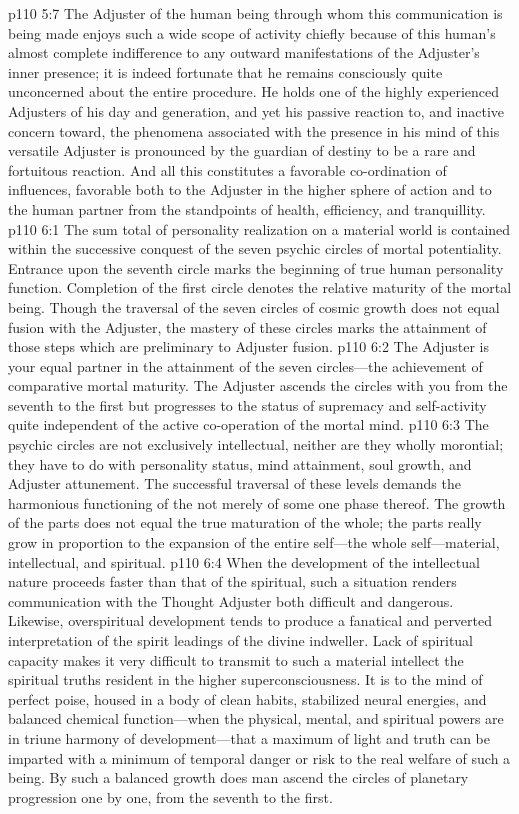\pc \vs p110 5:7 The Adjuster of the human being through whom this communication is being made enjoys such a wide scope of activity chiefly because of this human’s almost complete indifference to any outward manifestations of the Adjuster’s inner presence; it is indeed fortunate that he remains consciously quite unconcerned about the entire procedure. He holds one of the highly experienced Adjusters of his day and generation, and yet his passive reaction to, and inactive concern toward, the phenomena associated with the presence in his mind of this versatile Adjuster is pronounced by the guardian of destiny to be a rare and fortuitous reaction. And all this constitutes a favorable co\hyp{}ordination of influences, favorable both to the Adjuster in the higher sphere of action and to the human partner from the standpoints of health, efficiency, and tranquillity.
\vs p110 6:1 The sum total of personality realization on a material world is contained within the successive conquest of the seven psychic circles of mortal potentiality. Entrance upon the seventh circle marks the beginning of true human personality function. Completion of the first circle denotes the relative maturity of the mortal being. Though the traversal of the seven circles of cosmic growth does not equal fusion with the Adjuster, the mastery of these circles marks the attainment of those steps which are preliminary to Adjuster fusion.
\vs p110 6:2 The Adjuster is your equal partner in the attainment of the seven circles---the achievement of comparative mortal maturity. The Adjuster ascends the circles with you from the seventh to the first but progresses to the status of supremacy and self\hyp{}activity quite independent of the active co\hyp{}operation of the mortal mind.\plusone
\pc \vs p110 6:3 The psychic circles are not exclusively intellectual, neither are they wholly morontial; they have to do with personality status, mind attainment, soul growth, and Adjuster attunement. The successful traversal of these levels demands the harmonious functioning of the  not merely of some one phase thereof. The growth of the parts does not equal the true maturation of the whole; the parts really grow in proportion to the expansion of the entire self---the whole self---material, intellectual, and spiritual.
\vs p110 6:4 When the development of the intellectual nature proceeds faster than that of the spiritual, such a situation renders communication with the Thought Adjuster both difficult and dangerous. Likewise, overspiritual development tends to produce a fanatical and perverted interpretation of the spirit leadings of the divine indweller. Lack of spiritual capacity makes it very difficult to transmit to such a material intellect the spiritual truths resident in the higher superconsciousness. It is to the mind of perfect poise, housed in a body of clean habits, stabilized neural energies, and balanced chemical function---when the physical, mental, and spiritual powers are in triune harmony of development---that a maximum of light and truth can be imparted with a minimum of temporal danger or risk to the real welfare of such a being. By such a balanced growth does man ascend the circles of planetary progression one by one, from the seventh to the first.
